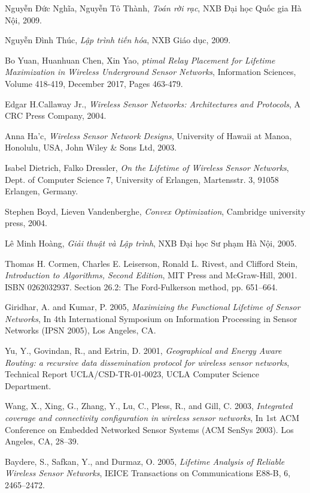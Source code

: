 \begin{thebibliography}{13}
    Nguyễn Đức Nghĩa, Nguyễn Tô Thành, 
    \textit{Toán rời rạc},
    NXB Đại học Quốc gia Hà Nội, 2009.
    
    Nguyễn Đình Thúc,
    \textit{Lập trình tiến hóa},
    NXB Giáo dục, 2009.

    Bo Yuan, Huanhuan Chen, Xin Yao,
    \textit{ptimal Relay Placement for Lifetime Maximization in Wireless Underground Sensor Networks},
    Information Sciences, Volume 418-419, December 2017, Pages 463-479.

    Edgar H.Callaway Jr.,
    \textit{Wireless Sensor Networks: Architectures and Protocols},
    A CRC Press Company, 2004.

    Anna Ha’c,
    \textit{Wireless Sensor Network Designs},
    University of Hawaii at Manoa, Honolulu, USA, John Wiley \& Sons Ltd, 2003.

    Isabel Dietrich, Falko Dressler,
    \textit{On the Lifetime of Wireless Sensor Networks},
    Dept. of Computer Science 7, University of Erlangen, Martensstr. 3, 91058 Erlangen, Germany.

    Stephen Boyd, Lieven Vandenberghe,
    \textit{Convex Optimization},
    Cambridge university press, 2004.

    Lê Minh Hoàng,
    \textit{Giải thuật và Lập trình},
    NXB Đại học Sư phạm Hà Nội, 2005.

    Thomas H. Cormen, Charles E. Leiserson, Ronald L. Rivest, and Clifford Stein,
    \textit{Introduction to Algorithms, Second Edition},
    MIT Press and McGraw-Hill, 2001. ISBN 0262032937. Section 26.2: The Ford-Fulkerson method, pp. 651–664.

    Giridhar, A. and Kumar, P. 2005,
    \textit{Maximizing the Functional Lifetime of Sensor Networks},
    In 4th International Symposium on Information Processing in Sensor Networks (IPSN 2005), Los Angeles, CA.

    Yu, Y., Govindan, R., and Estrin, D. 2001,
    \textit{Geographical and Energy Aware Routing: a recursive data dissemination protocol for wireless sensor networks},
    Technical Report UCLA/CSD-TR-01-0023, UCLA Computer Science Department.

    Wang, X., Xing, G., Zhang, Y., Lu, C., Pless, R., and Gill, C. 2003,
    \textit{Integrated coverage and connectivity configuration in wireless sensor networks},
    In 1st ACM Conference on Embedded Networked Sensor Systems (ACM SenSys 2003). Los Angeles, CA, 28–39.

    Baydere, S., Safkan, Y., and Durmaz, O. 2005,
    \textit{Lifetime Analysis of Reliable Wireless Sensor Networks},
    IEICE Transactions on Communications E88-B, 6, 2465–2472.
\end{thebibliography}
